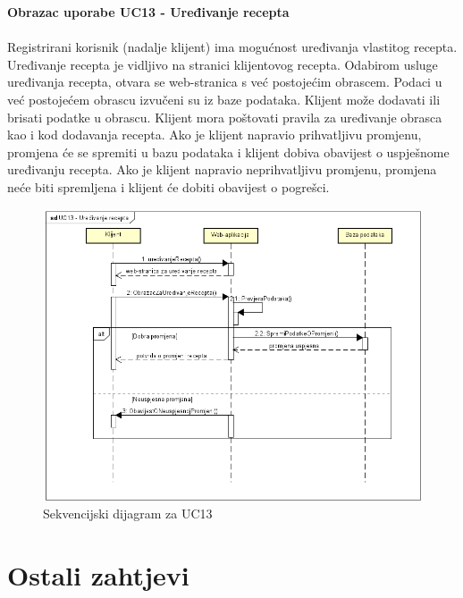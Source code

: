 \noindent\textbf{Obrazac uporabe UC13 - Uređivanje recepta}\\\\
Registrirani korisnik (nadalje klijent) ima mogućnost uređivanja vlastitog recepta.
Uređivanje recepta je vidljivo na stranici klijentovog recepta.
Odabirom usluge uređivanja recepta, otvara se web-stranica s već postojećim obrascem.
Podaci u već postojećem obrascu izvučeni su iz baze podataka.
Klijent može dodavati ili brisati podatke u obrascu.
Klijent mora poštovati pravila za uređivanje obrasca kao i kod dodavanja recepta.
Ako je klijent napravio prihvatljivu promjenu, promjena će se spremiti u bazu podataka i klijent dobiva obavijest o uspješnome uređivanju recepta.
Ako je klijent napravio neprihvatljivu promjenu, promjena neće biti spremljena i klijent će dobiti obavijest o pogrešci.
\begin{figure}[H]
	\includegraphics[scale=0.8]{slike/Slika10.png} %
	\centering
	\caption{Sekvencijski dijagram za UC13}
	\label{fig:promjene}
\end{figure}
\pagebreak


\eject

\section{Ostali zahtjevi}


